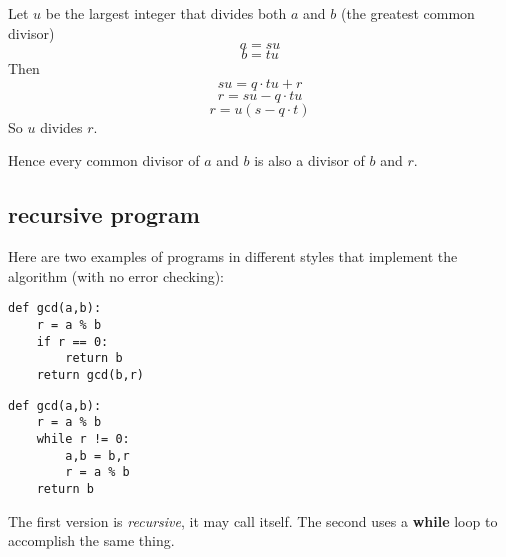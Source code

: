 \documentclass[11pt, oneside]{article}
\begin{document}
Let $u$ be the largest integer that divides both $a$ and $b$ (the greatest common divisor)
\[ a = su \]
\[ b = tu \]
Then 
\[ su = q \cdot tu + r \]
\[ r = su - q \cdot tu \]
\[ r = u(s - q \cdot t) \]
So $u$ divides $r$.

Hence every common divisor of $a$ and $b$ is also a divisor of $b$ and $r$.

\subsection*{recursive program}

Here are two examples of programs in different styles that implement the algorithm (with no error checking):

\begin{verbatim}
def gcd(a,b):
    r = a % b
    if r == 0:
        return b
    return gcd(b,r)
\end{verbatim}

\begin{verbatim}
def gcd(a,b):
    r = a % b
    while r != 0:
        a,b = b,r
        r = a % b
    return b
\end{verbatim}

The first version is \emph{recursive}, it may call itself.  The second uses a \textbf{while} loop to accomplish the same thing.
\end{document}
